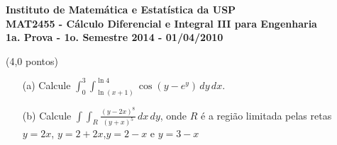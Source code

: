 \documentclass[12pt,a4paper]{article}
\begin{document}
\newpage
\begin{center}
\textbf{Instituto de Matemática e Estatística da USP\\
MAT2455 - Cálculo Diferencial e Integral III para Engenharia\\}
\textbf{1a. Prova - 1o. Semestre 2014 - 01/04/2010}
\end{center}


(4,0 pontos)
\begin{itemize}
	\item[(a)] Calcule $ \displaystyle{ \int_{0}^{3}  \int_{\ln{(x+1)}}^{\ln{4}} \cos{(y-e^y)}\,dy\, dx } $.
	
	\item[(b)] Calcule $\displaystyle{\int\!\!\!\int_R \frac{(y-2x)^8}{(y+x)^5}\,dx\,dy}$, onde $R$ é a região limitada pelas retas $y=2x$, $y=2+2x$,$y=2-x$ e $y=3-x$
	
\end{itemize}
\end{document}
